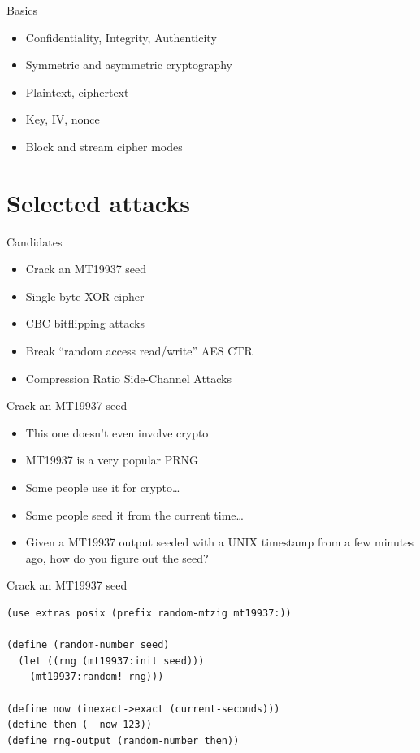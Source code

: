 \documentclass[presentation]{beamer}
\begin{document}
\begin{frame}[label=sec-1-4]{Basics}
\begin{itemize}
\item Confidentiality, Integrity, Authenticity
\item Symmetric and asymmetric cryptography
\item Plaintext, ciphertext
\item Key, IV, nonce
\item Block and stream cipher modes
\end{itemize}
\end{frame}

\section{Selected attacks}
\label{sec-2}

\begin{frame}[label=sec-2-1]{Candidates}
\begin{itemize}
\item Crack an MT19937 seed
\item Single-byte XOR cipher
\item CBC bitflipping attacks
\item Break “random access read/write” AES CTR
\item Compression Ratio Side-Channel Attacks
\end{itemize}
\end{frame}

\begin{frame}[label=sec-2-2]{Crack an MT19937 seed}
\begin{itemize}
\item This one doesn't even involve crypto
\item MT19937 is a very popular PRNG
\item Some people use it for crypto\ldots{}
\item Some people seed it from the current time\ldots{}
\item Given a MT19937 output seeded with a UNIX timestamp from a few
minutes ago, how do you figure out the seed?
\end{itemize}
\end{frame}

\begin{frame}[fragile,label=sec-2-3]{Crack an MT19937 seed}
 \begin{verbatim}
(use extras posix (prefix random-mtzig mt19937:))

(define (random-number seed)
  (let ((rng (mt19937:init seed)))
    (mt19937:random! rng)))

(define now (inexact->exact (current-seconds)))
(define then (- now 123))
(define rng-output (random-number then))
\end{verbatim}
\end{frame}
\end{document}

